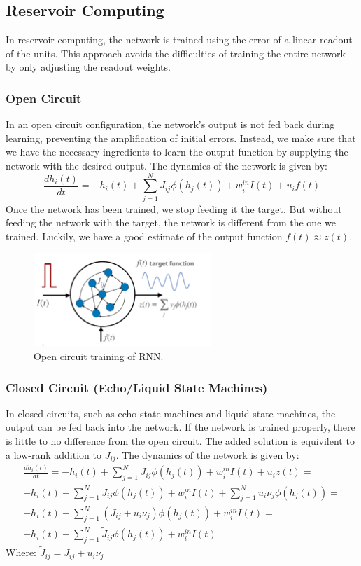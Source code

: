 \documentclass[11pt]{book} %
\begin{document}
\subsection{Reservoir Computing}
In reservoir computing, the network is trained using the error of a linear readout of the units. 
This approach avoids the difficulties of training the entire network by only adjusting the readout weights.

\subsubsection{Open Circuit}
In an open circuit configuration, the network's output is not fed back during learning, preventing the amplification of initial errors. 
Instead, we make sure that we have the necessary ingredients to learn the output function by supplying the network with the desired output.
The dynamics of the network is given by:
\[
    \frac{dh_i(t)}{dt} = -h_i(t) + \sum_{j=1}^N J_{ij} \phi(h_j(t)) + w_i^{in} I(t) + u_i f(t)
\]
Once the network has been trained, we stop feeding it the target.
But without feeding the network with the target, the network is different from the one we trained.
Luckily, we have a good estimate of the output function $f(t) \approx z(t)$.

\begin{figure}[ht]
\centering
\includegraphics[width=0.6\textwidth]{Figs/RNN_open_circuit.jpeg}
\caption{Open circuit training of RNN.}
\label{fig:rnn_learning}
\end{figure}


\subsubsection{Closed Circuit (Echo/Liquid State Machines)}
In closed circuits, such as echo-state machines and liquid state machines, the output can be fed back into the network. 
If the network is trained properly, there is little to no difference from the open circuit.
The added solution is equivilent to a low-rank addition to $J_{ij}$.
The dynamics of the network is given by:
\begin{align*}
    \frac{dh_i(t)}{dt} = -h_i(t) + \sum_{j=1}^N J_{ij} \phi(h_j(t)) + w_i^{in} I(t) + u_i z(t) = \\
    -h_i(t) + \sum_{j=1}^N J_{ij} \phi(h_j(t)) + w_i^{in} I(t) + \sum_{j=1}^N u_i \nu_j \phi(h_j(t)) = \\
    -h_i(t) + \sum_{j=1}^N (J_{ij} + u_i \nu_j) \phi(h_j(t)) + w_i^{in} I(t) = \\
    -h_i(t) + \sum_{j=1}^N \tilde{J}_{ij} \phi(h_j(t)) + w_i^{in} I(t)
\end{align*}
Where: $\tilde{J}_{ij} = J_{ij} + u_i \nu_j$
\end{document}
